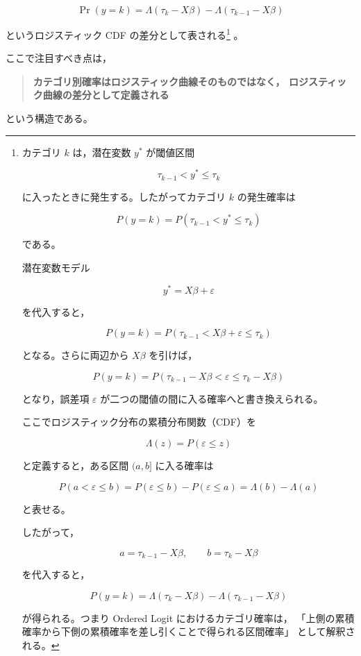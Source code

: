 \[
\Pr(y=k)
=
\Lambda(\tau_k - X\beta)
-
\Lambda(\tau_{k-1} - X\beta)
\]



というロジスティック CDF の差分として表される\footnote{
カテゴリ $k$ は，潜在変数 $y^*$ が閾値区間

\[
\tau_{k-1}<y^*\le\tau_k
\]

に入ったときに発生する。したがってカテゴリ $k$ の発生確率は

\[
P(y=k)
=
P(\tau_{k-1}<y^*\le\tau_k)
\]

である。

潜在変数モデル

\[
y^*=X\beta+\varepsilon
\]

を代入すると，

\[
P(y=k)
=
P(\tau_{k-1}<X\beta+\varepsilon\le\tau_k)
\]

となる。さらに両辺から $X\beta$ を引けば，

\[
P(y=k)
=
P(\tau_{k-1}-X\beta
<
\varepsilon
\le
\tau_k-X\beta)
\]

となり，誤差項 $\varepsilon$ が二つの閾値の間に入る確率へと書き換えられる。

ここでロジスティック分布の累積分布関数（CDF）を

\[
\Lambda(z)
=
P(\varepsilon\le z)
\]

と定義すると，ある区間 $(a,b]$ に入る確率は

\[
P(a<\varepsilon\le b)
=
P(\varepsilon\le b)
-
P(\varepsilon\le a)
=
\Lambda(b)-\Lambda(a)
\]

と表せる。

したがって，

\[
a=\tau_{k-1}-X\beta,\qquad
b=\tau_k-X\beta
\]

を代入すると，

\[
P(y=k)
=
\Lambda(\tau_k-X\beta)
-
\Lambda(\tau_{k-1}-X\beta)
\]

が得られる。つまり Ordered Logit におけるカテゴリ確率は，
「上側の累積確率から下側の累積確率を差し引くことで得られる区間確率」
として解釈される。
}
。

ここで注目すべき点は，

\begin{quote}
\textbf{カテゴリ別確率はロジスティック曲線そのものではなく，
ロジスティック曲線の差分として定義される}
\end{quote}

という構造である。



